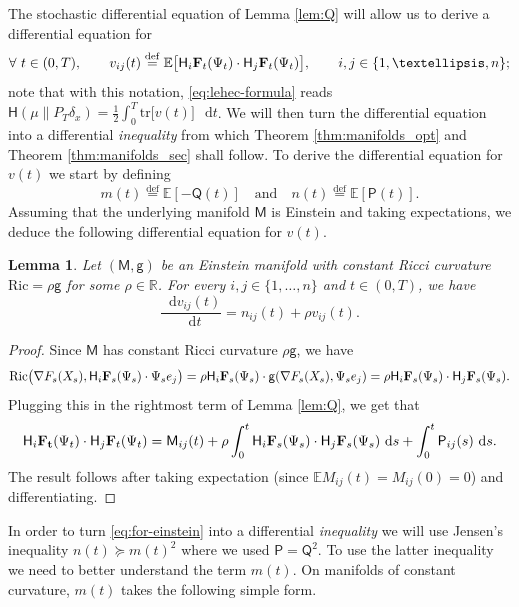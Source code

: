 \documentclass[a4paper,twoside,11pt,reqno]{amsart}
\newcommand{\eqdef}{\stackrel{\mathrm{def}}{=}}
\newtheorem{lemma}[theorem]{Lemma}
\newcommand*\diff{\mathop{}\!\mathrm{d}}
\newcommand{\R}{\mathbb{R}} %
\newcommand{\li}{\bf }
\newcommand{\MM}{\mathsf{M}}
\newcommand{\GG}{\mathsf{g}}
\newcommand{\mb}{\mathbb}
\newcommand{\msf}{\mathsf}
\newcommand{\mr}{\mathrm}
\newcommand{\HH}{\mathsf{H}}
\begin{document}
The stochastic differential equation of Lemma \ref{lem:Q} will allow us to derive a differential equation for 
\begin{equation}
\label{eq:vij}
\forall \ t\in(0,T),\qquad v_{ij}(t) \eqdef \mb{E}\big[ \HH_i {\li F}_t(\Psi_t) \cdot \HH_j {\li F}_t(\Psi_t)\big],\qquad i,j\in\{1,\ldots,n\};
\end{equation}
note that with this notation, \eqref{eq:lehec-formula} reads $\HH(\mu \| P_T\delta_x)  = \frac{1}{2}\int_0^T \mr{tr}\big[ v(t)\big] \,\diff t$. We will then turn the differential equation into a differential \emph{inequality} from which Theorem \ref{thm:manifolds_opt} and Theorem \ref{thm:manifolds_sec}  shall follow. To derive the  differential equation for $v(t)$ we start by defining
\begin{equation}
\label{eq:mn}
m(t) \eqdef \mb{E}[-\msf{Q}(t)]\quad \text{and}\quad n(t) \eqdef \mb{E}[\msf{P}(t)]. 
\end{equation}
Assuming that the underlying manifold $\MM$ is Einstein and taking expectations, we deduce the following differential equation for $v(t)$. 

\begin{lemma}\label{lem:v(t)ODE}
Let $(\MM,\GG)$ be an Einstein manifold with constant Ricci curvature $\mr{Ric}=\rho\GG$ for some $\rho\in\R$. For every $i,j\in\{1,\ldots,n\}$ and $t\in(0,T)$, we have
\begin{equation} \label{eq:for-einstein}
\frac{\diff v_{ij}(t)}{\diff t} = n_{ij}(t) + \rho v_{ij}(t).
\end{equation}
\end{lemma}

\begin{proof}
Since $\MM$ has constant Ricci curvature $\rho\GG$, we have
\begin{equation}
\mathrm{Ric}\big( \nabla F_s(X_s), \HH_i {\li F}_s(\Psi_s)\cdot \Psi_s e_j\big) = \rho \HH_i {\li F}_s(\Psi_s)\cdot \GG(\nabla F_s(X_s), \Psi_s e_j) = \rho\HH_i {\li F}_s(\Psi_s)\cdot \HH_j {\li F}_s(\Psi_s).
\end{equation}
Plugging this in the rightmost term of Lemma \ref{lem:Q}, we get that
\begin{equation}
\HH_i{\li F_t}(\Psi_t) \cdot \HH_j{\li F}_t(\Psi_t) = \MM_{ij}(t) +\rho \int_0^t \HH_i {\li F}_s(\Psi_s)\cdot \HH_j {\li F}_s(\Psi_s)\,\diff s + \int_0^t \msf{P}_{ij}(s) \, \diff s.
\end{equation}
The result follows after taking expectation (since $\mb{E} M_{ij}(t) = M_{ij}(0) = 0$) and differentiating.
\end{proof}
In order to turn \eqref{eq:for-einstein} into a differential \emph{inequality}  we will use Jensen's inequality $n(t)\succeq m(t)^2$ where we used $\msf{P}=\msf{Q}^2$. To use the latter inequality we need to better understand the term $m(t)$. On manifolds of constant curvature, $m(t)$ takes the following simple form. 
\end{document}
